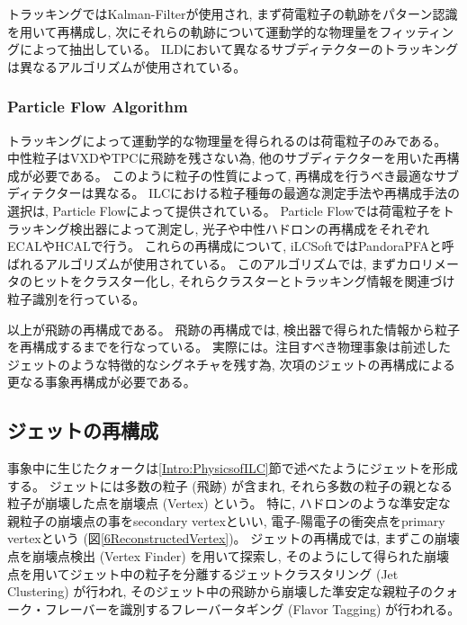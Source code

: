 トラッキングではKalman-Filterが使用され, まず荷電粒子の軌跡をパターン認識を用いて再構成し, 次にそれらの軌跡について運動学的な物理量をフィッティングによって抽出している。
ILDにおいて異なるサブディテクターのトラッキングは異なるアルゴリズムが使用されている。

\subsubsection{Particle Flow Algorithm}

トラッキングによって運動学的な物理量を得られるのは荷電粒子のみである。
中性粒子はVXDやTPCに飛跡を残さない為, 他のサブディテクターを用いた再構成が必要である。
このように粒子の性質によって, 再構成を行うべき最適なサブディテクターは異なる。
ILCにおける粒子種毎の最適な測定手法や再構成手法の選択は, Particle Flowによって提供されている。
Particle Flowでは荷電粒子をトラッキング検出器によって測定し, 光子や中性ハドロンの再構成をそれぞれECALやHCALで行う。
これらの再構成について, iLCSoftではPandoraPFAと呼ばれるアルゴリズムが使用されている。
このアルゴリズムでは, まずカロリメータのヒットをクラスター化し, それらクラスターとトラッキング情報を関連づけ粒子識別を行っている。

以上が飛跡の再構成である。
飛跡の再構成では, 検出器で得られた情報から粒子を再構成するまでを行なっている。
実際には。注目すべき物理事象は前述したジェットのような特徴的なシグネチャを残す為, 次項のジェットの再構成による更なる事象再構成が必要である。


\subsection{ジェットの再構成} \label{Intro:SoftERILC:JetReconstruction}

事象中に生じたクォークは\ref{Intro:PhysicsofILC}節で述べたようにジェットを形成する。
ジェットには多数の粒子 (飛跡) が含まれ, それら多数の粒子の親となる粒子が崩壊した点を崩壊点 (Vertex) という。
特に, ハドロンのような準安定な親粒子の崩壊点の事をsecondary vertexといい, 電子-陽電子の衝突点をprimary vertexという (図\ref{6ReconstructedVertex})。
ジェットの再構成では, まずこの崩壊点を崩壊点検出 (Vertex Finder) を用いて探索し, そのようにして得られた崩壊点を用いてジェット中の粒子を分離するジェットクラスタリング (Jet Clustering) が行われ, そのジェット中の飛跡から崩壊した準安定な親粒子のクォーク・フレーバーを識別するフレーバータギング (Flavor Tagging) が行われる。

